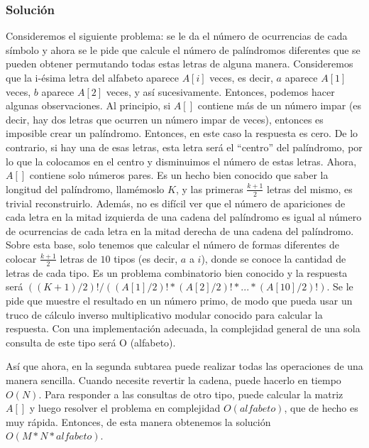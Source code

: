 \documentclass[12pt]{article}
\newcommand{\nl}{\vspace{0.3cm}}
\begin{document}
\subsubsection{Solución}

Consideremos el siguiente problema: se le da el número de ocurrencias de cada símbolo y ahora se le pide que calcule el número de palíndromos diferentes que se pueden obtener permutando todas estas letras de alguna manera. Consideremos que la i-ésima letra del alfabeto aparece $A[i]$ veces, es decir, $a$ aparece $A[1]$ veces, $b$ aparece $A[2]$ veces, y así sucesivamente. Entonces, podemos hacer algunas observaciones. Al principio, si $A[]$ contiene más de un número impar (es decir, hay dos letras que ocurren un número impar de veces), entonces es imposible crear un palíndromo. Entonces, en este caso la respuesta es cero. De lo contrario, si hay una de esas letras, esta letra será el “centro” del palíndromo, por lo que la colocamos en el centro y disminuimos el número de estas letras. Ahora, $A[]$ contiene solo números pares. Es un hecho bien conocido que saber la longitud del palíndromo, llamémoslo $K$, y las primeras $\frac{k + 1}{2}$ letras del mismo, es trivial reconstruirlo. Además, no es difícil ver que el número de apariciones de cada letra en la mitad izquierda de una cadena del palíndromo es igual al número de ocurrencias de cada letra en la mitad derecha de una cadena del palíndromo. Sobre esta base, solo tenemos que calcular el número de formas diferentes de colocar $\frac{k + 1}{2}$ letras de $10$ tipos (es decir, $a$ a $i$), donde se conoce la cantidad de letras de cada tipo. Es un problema combinatorio bien conocido y la respuesta será $((K + 1) / 2)! / ((A [1] / 2)! * (A [2] / 2)! * ... * (A [ 10] / 2)!)$. Se le pide que muestre el resultado en un número primo, de modo que pueda usar un truco de cálculo inverso multiplicativo modular conocido para calcular la respuesta. Con una implementación adecuada, la complejidad general de una sola consulta de este tipo será O (alfabeto).

\nl

Así que ahora, en la segunda subtarea puede realizar todas las operaciones de una manera sencilla. Cuando necesite revertir la cadena, puede hacerlo en tiempo $O(N)$. Para responder a las consultas de otro tipo, puede calcular la matriz $A[]$ y luego resolver el problema en complejidad $O(alfabeto)$, que de hecho es muy rápida. Entonces, de esta manera obtenemos la solución $O(M * N * alfabeto)$.

\nl
\end{document}
